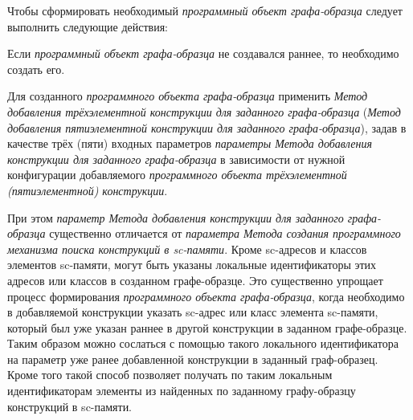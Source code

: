 Чтобы сформировать необходимый \textit{программный объект графа-образца} следует выполнить следующие действия:
\begin{textitemize}
	\item Если \textit{программный объект графа-образца} не создавался раннее, то необходимо создать его.
	\item Для созданного \textit{программного объекта графа-образца} применить \textit{Метод добавления трёхэлементной конструкции для заданного графа-образца} (\textit{Метод добавления пятиэлементной конструкции для заданного графа-образца}), задав в качестве трёх (пяти) входных параметров \textit{параметры Метода добавления конструкции для заданного графа-образца} в зависимости от нужной конфигурации добавляемого \textit{программного объекта трёхэлементной (пятиэлементной) конструкции}.
\end{textitemize}

При этом \textit{параметр Метода добавления конструкции для заданного графа-образца} существенно отличается от \textit{параметра Метода создания программного механизма поиска конструкций в sc-памяти}. Кроме sc-адресов и классов элементов sc-памяти, могут быть указаны локальные идентификаторы этих адресов или классов в созданном графе-образце. Это существенно упрощает процесс формирования \textit{программного объекта графа-образца}, когда необходимо в добавляемой конструкции указать sc-адрес или класс элемента sc-памяти, который был уже указан раннее в другой конструкции в заданном графе-образце. Таким образом можно сослаться с помощью такого локального идентификатора на параметр уже ранее добавленной конструкции в заданный граф-образец. Кроме того такой способ позволяет получать по таким локальным идентификаторам элементы из найденных по заданному графу-образцу конструкций в sc-памяти.

